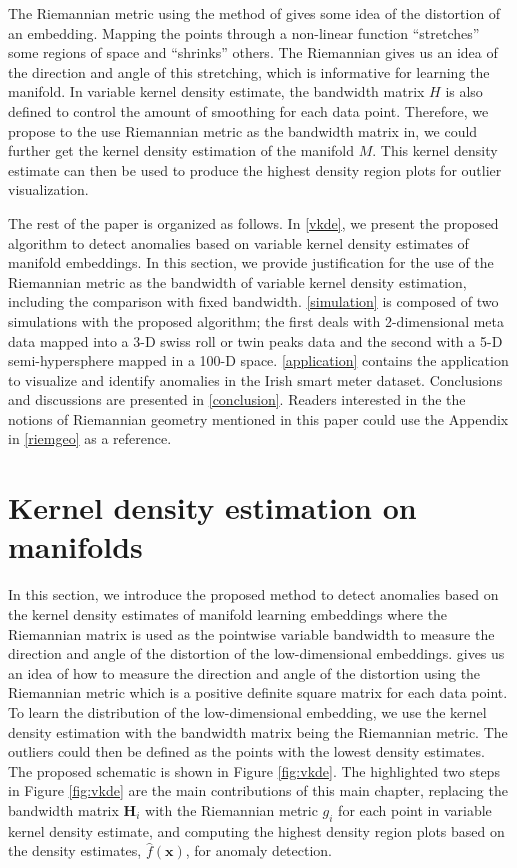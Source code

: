 \documentclass[11pt,a4paper,]{article}
\begin{document}
The Riemannian metric using the method of \textcite{Perrault-Joncas2013-pq} gives
some idea of the distortion of an embedding. Mapping the points through
a non-linear function ``stretches'' some regions of space and ``shrinks''
others. The Riemannian gives us an idea of the direction and angle of
this stretching, which is informative for learning the manifold. In
variable kernel density estimate, the bandwidth matrix \(H\) is also
defined to control the amount of smoothing for each data point.
Therefore, we propose to the use Riemannian metric as the bandwidth
matrix in, we could further get the kernel density estimation of the
manifold \(M\). This kernel density estimate can then be used to produce
the highest density region plots \autocite{Hyndman1996-lk} for outlier
visualization.

The rest of the paper is organized as follows. In \autoref{vkde}, we
present the proposed algorithm to detect anomalies based on variable
kernel density estimates of manifold embeddings. In this section, we
provide justification for the use of the Riemannian metric as the
bandwidth of variable kernel density estimation, including the
comparison with fixed bandwidth. \autoref{simulation} is composed of two
simulations with the proposed algorithm; the first deals with
2-dimensional meta data mapped into a 3-D swiss roll or twin peaks data
and the second with a 5-D semi-hypersphere mapped in a 100-D space.
\autoref{application} contains the application to visualize and identify
anomalies in the Irish smart meter dataset. Conclusions and discussions
are presented in \autoref{conclusion}. Readers interested in the the
notions of Riemannian geometry mentioned in this paper could use the
Appendix in \autoref{riemgeo} as a reference.

\hypertarget{vkde}{%
\section{Kernel density estimation on manifolds}\label{vkde}}

In this section, we introduce the proposed method to detect anomalies
based on the kernel density estimates of manifold learning embeddings
where the Riemannian matrix is used as the pointwise variable bandwidth
to measure the direction and angle of the distortion of the
low-dimensional embeddings. \textcite{Perrault-Joncas2013-pq} gives us an idea of
how to measure the direction and angle of the distortion using the
Riemannian metric which is a positive definite square matrix for each
data point. To learn the distribution of the low-dimensional embedding,
we use the kernel density estimation with the bandwidth matrix being the
Riemannian metric. The outliers could then be defined as the points with
the lowest density estimates. The proposed schematic is shown in Figure
\ref{fig:vkde}. The highlighted two steps in Figure \ref{fig:vkde} are
the main contributions of this main chapter, replacing the bandwidth
matrix \(\pmb{H}_i\) with the Riemannian metric \(g_i\) for each point in
variable kernel density estimate, and computing the highest density
region plots based on the density estimates, \(\hat{f}(\pmb{x})\), for
anomaly detection.
\end{document}
